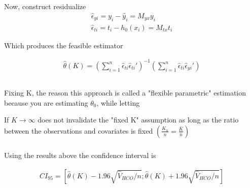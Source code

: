 \documentclass[12pt]{article}
\begin{document}
Now, construct residualize
\begin{gather*}
\hat{\epsilon}_{yi} = y_i - \hat{y}_i = M_{yx}y_i \\
\hat{\epsilon}_{ti} = t_i - h_0(x_i)   = M_{tx}t_i
\end{gather*}

Which produces the feasible estimator

\begin{gather*}
\hat{\theta}(K) = \left( \sum\limits_{i=1}^n \hat{\epsilon}_{ti} \hat{\epsilon}_{ti}' \right)^{-1} \left( \sum\limits_{i=1}^n \hat{\epsilon}_{ti} \hat{\epsilon}_{yi}' \right)
\end{gather*}


\subsection{}
\subsubsection{}
Fixing K, the reason this approach is called a "flexible parametric" estimation because you are estimating $\theta_0$, while letting

If $K\rightarrow\infty$ does not invalidate the "fixed K" assumption as long as the ratio between the observations and covariates is fixed $\left( \frac{K_n}{n} = \frac{\bar{K}}{\bar{n}}   \right)$

\subsubsection{}
Using the results above the confidence interval is

\begin{gather*}
CI_{95} = \left[\hat{\theta}(K)  - 1.96  \sqrt{\hat{V}_{HCO} / n}  ; \hat{\theta}(K) + 1.96  \sqrt{\hat{V}_{HCO} / n} \right]
\end{gather*}

\subsection{}
\end{document}
